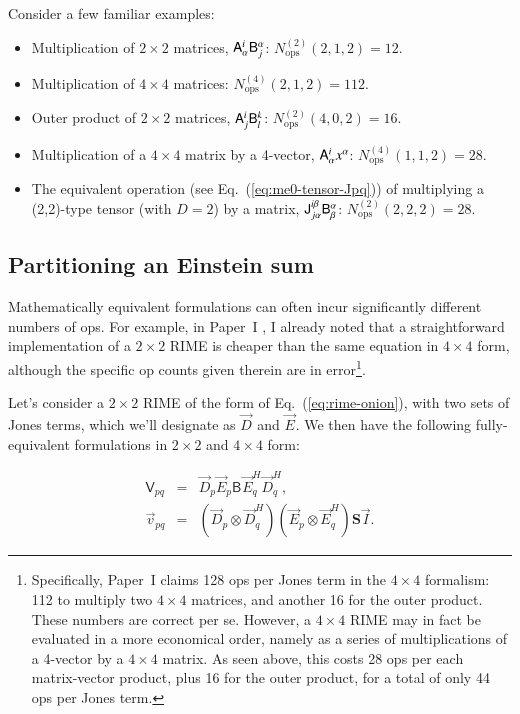 \documentclass{aa}
\newcommand{\herm}{H}
\newcommand{\jones}[2]{\vec {#1}_{#2}}
\newcommand{\jonesT}[2]{\vec {#1}^{\herm}_{#2}}
\newcommand{\coh}[2]{\mathsf{{#1}}_{{#2}}}
\begin{document}
Consider a few familiar examples:

\begin{itemize}
\item Multiplication of $2\times2$ matrices, $\mathsf{A}^i_\alpha\mathsf{B}^\alpha_j$: $N_\mathrm{ops}^{(2)}(2,1,2)=12$.
\item Multiplication of $4\times4$ matrices: $N_\mathrm{ops}^{(4)}(2,1,2)=112$.
\item Outer product of $2\times2$ matrices, $\mathsf{A}^i_j\mathsf{B}^k_l$:  $N_\mathrm{ops}^{(2)}(4,0,2)=16$.
\item Multiplication of a $4\times4$ matrix by a 4-vector, $\mathsf{A}^i_\alpha x^\alpha$:  $N_\mathrm{ops}^{(4)}(1,1,2)=28$.
\item The equivalent operation (see Eq.~(\ref{eq:me0-tensor-Jpq})) of multiplying a (2,2)-type tensor (with $D=2$) by a matrix, 
$\mathsf{J}^{i\beta}_{j\alpha}\mathsf{B}^\alpha_\beta$: $N_\mathrm{ops}^{(2)}(2,2,2)=28$.

\end{itemize}

\subsection{Partitioning an Einstein sum}

Mathematically equivalent formulations can often incur significantly different numbers of ops. For example, in Paper~I \citep[Sect.~6.1]{RRIME1}, I already noted that a straightforward implementation of a $2\times2$ RIME is cheaper than the same equation in $4\times4$ form, although the specific op counts given therein are in error\footnote{Specifically, Paper~I claims 128 ops per Jones term in the $4\times4$ formalism: 112 to multiply two $4\times4$ matrices, and another 16 for the outer product. These numbers are correct per se. However, a $4\times4$ RIME may in fact be evaluated in a more economical order, namely as a series of multiplications of a 4-vector by a $4\times4$ matrix. As seen above, this costs 28 ops per each matrix-vector product, plus 16 for the outer product, for a total of only 44 ops per Jones term.}.

Let's consider a $2\times2$ RIME of the form of Eq.~(\ref{eq:rime-onion}), with two sets of Jones terms, which we'll designate as $\jones{D}{}$ and $\jones{E}{}$. We then have the following fully-equivalent formulations in $2\times2$ and $4\times4$ form:

\begin{eqnarray}
\label{eq:example-2x2}
  \coh{V}{pq} &=& \jones{D}{p}\jones{E}{p} \coh{B}{} \jonesT{E}{q} \jonesT{D}{q}, \\
\label{eq:example-4x4}
  \vec v_{pq} &=& (\jones{D}{p}\otimes\jonesT{D}{q})(\jones{E}{p}\otimes\jonesT{E}{q})
              \mathbf{S}{} \vec I.
\end{eqnarray}
\end{document}
